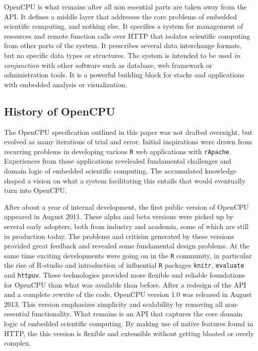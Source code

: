 \documentclass{article}
\newcommand{\R}{\texttt{R}\xspace}
\begin{document}
OpenCPU is what remains after all non essential parts are taken away from the API. It defines a middle layer that addresses the core problems of embedded scientific computing, and nothing else. It specifies a system for management of resources and remote function calls over HTTP that isolates scientific computing from other parts of the system. It prescribes several data interchange formats, but no specific data types or structures. The system is intended to be used \emph{in conjunction} with other software such as database, web framework or administration tools. It is a powerful building block for stacks and applications with embedded analysis or visualization. 

\subsection{History of OpenCPU}

The OpenCPU specification outlined in this paper was not drafted overnight, but evolved as many iterations of trial and error. Initial inspirations were drawn from recurring problems in developing various \R web applications with \texttt{rApache}. Experiences from these applications revelealed fundamental challenges and domain logic of embedded scientific computing. The accumulated knowledge shaped a vision on what a system facilitating this entails that would eventually turn into OpenCPU.

After about a year of internal development, the first public version of OpenCPU appeared in August 2011. These alpha and beta versions were picked up by several early adopters, both from industry and academia, some of which are still in production today. The problems and critisim generated by these versions provided great feedback and revealed some fundamental design problems. At the same time exciting developments were going on in the \R community, in particular the rise of R-studio and introduction of influential \R packages \texttt{knitr}, \texttt{evaluate} and \texttt{httpuv}. These technologies provided more flexible and reliable foundations for OpenCPU than what was available than before. After a redesign of the API and a complete rewrite of the code, OpenCPU version  1.0 was released in August 2013. This version emphasizes simplicity and scalability by removing all non-essential functionality. What remains is an API that captures the core domain logic of embedded scientific computing. By making use of native features found in HTTP, the this version is flexible and extensible without getting bloated or overly complex.
\end{document}
